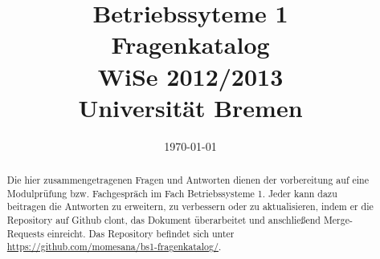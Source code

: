 \documentclass[12pt,a4paper,ngerman]{scrartcl}
\title{Betriebssyteme 1 \\ Fragenkatalog \\ WiSe 2012/2013 \\[5pt] \Large{Universität Bremen}}
\date{\today}
\makeatletter
\newcommand{\question}[1]{
	\subsection[\truncate{0.80\textwidth}{#1}]{
	\textcolor{blue}{#1}}}
\newenvironment{multilinequestion}[1][]
	{\subsection[\truncate{0.80\textwidth}{#1}]{\textcolor{blue}{#1}} \color{blue}}
	{}
\newlength\RightBarWidth
\newenvironment{rightbar}
	{
	\def\FrameCommand##1{%
	\hspace{\textwidth}\hspace{-\RightBarWidth}%
	{\color{dkgreen}\vrule width \RightBarWidth}
	\hspace{-\textwidth}##1\hfill}%
	\MakeFramed{\addtolength\hsize{-\width-\RightBarWidth-\columnsep}%
	\FrameRestore}%
	}
	{\endMakeFramed}
\newcommand\mystuff@footnotebuffer{}
\newcounter{mystuff@footnote}
\newcommand\bufferfootnotes{
	\let\mystuff@footnoteold\footnote
	\setcounter{mystuff@footnote}{\thefootnote}
	\renewcommand\mystuff@footnotebuffer{}
	\renewcommand{\footnote}[1]{
		\footnotemark
		\g@addto@macro{\mystuff@footnotebuffer}{
			\stepcounter{mystuff@footnote}
			\protect\footnotetext[\themystuff@footnote]{##1}
		}
	}
}
\newcommand\stopbufferingfootnotes{%
	\mystuff@footnotebuffer%
	\renewcommand{\footnote}[1]{\mystuff@footnoteold{##1}}%
}
\newenvironment {answer}
                {\bufferfootnotes\begin{rightbar} }
                {\end{rightbar}\stopbufferingfootnotes}
\makeatother
\begin{document}
\maketitle

\begin{abstract}
Die hier zusammengetragenen Fragen und Antworten dienen der vorbereitung auf eine Modulprüfung bzw. Fachgespräch im Fach Betriebssysteme 1. Jeder kann dazu beitragen die Antworten zu erweitern, zu verbessern oder zu aktualisieren, indem er die Repository auf Github clont, das Dokument überarbeitet und anschließend Merge-Requests einreicht. Das Repository befindet sich unter  \url{https://github.com/momesana/bs1-fragenkatalog/}.
\end{abstract}

\newpage

\tableofcontents 

%
%



















%

%

%
\end{document}
